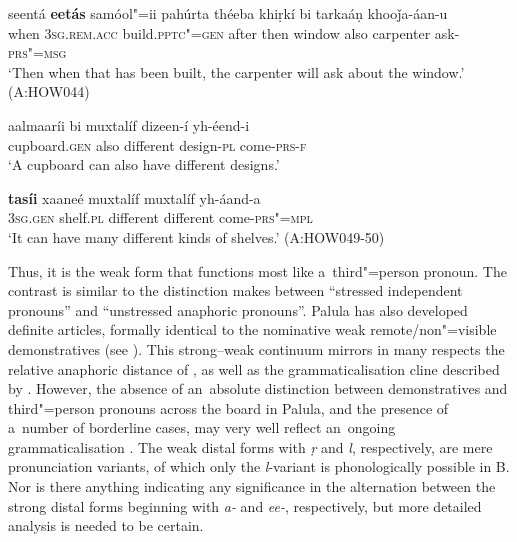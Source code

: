 \begin{exe}
\ex
\label{ex:5-16}
\gll seentá \textbf{eetás} samóol"=ii pahúrta théeba khiṛkí bi tarkaáṇ
khooǰa-áan-u\\
when \textsc{3sg}.\textsc{rem.acc} build.\textsc{pptc"=gen} after then window also carpenter ask-\textsc{prs"=msg} \\
\glt `Then when that has been built, the carpenter will ask about the window.' (A:HOW044)
\end{exe}


\begin{exe}
\ex
\label{ex:5-17}
\gll aalmaaríi bi muxtalíf dizeen-í yh-éend-i\\
cupboard.\textsc{gen} also different design-\textsc{pl} come-\textsc{prs-f}\\
\glt `A cupboard can also have different designs.' 

\gll \textbf{tasíi} xaaneé muxtalíf muxtalíf yh-áand-a \\
\textsc{3sg.gen} shelf.\textsc{pl} different different come-\textsc{prs"=mpl} \\
\glt `It can have many different kinds of shelves.' (A:HOW049-50)
\end{exe}

Thus, it is the weak form that functions most like a~third"=person pronoun. The contrast is similar to the distinction \citet[417--419]{givon2001a} makes between ``stressed independent pronouns'' and ``unstressed anaphoric pronouns''. Palula has also developed definite articles, formally identical to the nominative weak remote/non"=visible demonstratives (see ). This strong--weak continuum mirrors in many respects the relative anaphoric distance of \citet[419]{givon2001a}, as well as the grammaticalisation cline described by \citet[432]{diessel2006}. However, the absence of an~absolute distinction between demonstratives and third"=person pronouns across the board in Palula, and the presence of a~number of borderline cases, may very well reflect an~ongoing grammaticalisation \citep[213]{himmelmann1996}. The weak distal forms with \textit{ṛ} and \textit{l}, respectively, are mere pronunciation variants, of which only the \textit{l}-variant is phonologically possible in B. Nor is there anything indicating any significance in the alternation between the strong distal forms beginning with \textit{a-} and \textit{ee-}, respectively, but more detailed analysis is needed to be certain.



